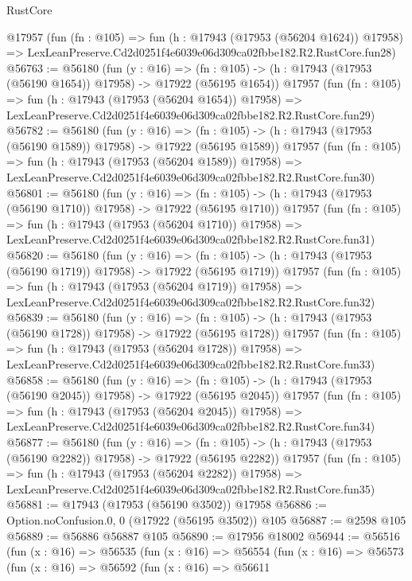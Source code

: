 \begin{lexlean}{RustCore}
\begin{coremodule}
    @17957
    (fun (fn : @105) =>
    fun (h : @17943 (@17953 (@56204 @1624)) @17958) =>
    LexLeanPreserve.Cd2d0251f4e6039e06d309ca02fbbe182.R2.RustCore.fun28)
@56763 := @56180
    (fun (y : @16) =>
    (fn : @105) -> (h : @17943 (@17953 (@56190 @1654)) @17958) -> @17922 (@56195 @1654))
    @17957
    (fun (fn : @105) =>
    fun (h : @17943 (@17953 (@56204 @1654)) @17958) =>
    LexLeanPreserve.Cd2d0251f4e6039e06d309ca02fbbe182.R2.RustCore.fun29)
@56782 := @56180
    (fun (y : @16) =>
    (fn : @105) -> (h : @17943 (@17953 (@56190 @1589)) @17958) -> @17922 (@56195 @1589))
    @17957
    (fun (fn : @105) =>
    fun (h : @17943 (@17953 (@56204 @1589)) @17958) =>
    LexLeanPreserve.Cd2d0251f4e6039e06d309ca02fbbe182.R2.RustCore.fun30)
@56801 := @56180
    (fun (y : @16) =>
    (fn : @105) -> (h : @17943 (@17953 (@56190 @1710)) @17958) -> @17922 (@56195 @1710))
    @17957
    (fun (fn : @105) =>
    fun (h : @17943 (@17953 (@56204 @1710)) @17958) =>
    LexLeanPreserve.Cd2d0251f4e6039e06d309ca02fbbe182.R2.RustCore.fun31)
@56820 := @56180
    (fun (y : @16) =>
    (fn : @105) -> (h : @17943 (@17953 (@56190 @1719)) @17958) -> @17922 (@56195 @1719))
    @17957
    (fun (fn : @105) =>
    fun (h : @17943 (@17953 (@56204 @1719)) @17958) =>
    LexLeanPreserve.Cd2d0251f4e6039e06d309ca02fbbe182.R2.RustCore.fun32)
@56839 := @56180
    (fun (y : @16) =>
    (fn : @105) -> (h : @17943 (@17953 (@56190 @1728)) @17958) -> @17922 (@56195 @1728))
    @17957
    (fun (fn : @105) =>
    fun (h : @17943 (@17953 (@56204 @1728)) @17958) =>
    LexLeanPreserve.Cd2d0251f4e6039e06d309ca02fbbe182.R2.RustCore.fun33)
@56858 := @56180
    (fun (y : @16) =>
    (fn : @105) -> (h : @17943 (@17953 (@56190 @2045)) @17958) -> @17922 (@56195 @2045))
    @17957
    (fun (fn : @105) =>
    fun (h : @17943 (@17953 (@56204 @2045)) @17958) =>
    LexLeanPreserve.Cd2d0251f4e6039e06d309ca02fbbe182.R2.RustCore.fun34)
@56877 := @56180
    (fun (y : @16) =>
    (fn : @105) -> (h : @17943 (@17953 (@56190 @2282)) @17958) -> @17922 (@56195 @2282))
    @17957
    (fun (fn : @105) =>
    fun (h : @17943 (@17953 (@56204 @2282)) @17958) =>
    LexLeanPreserve.Cd2d0251f4e6039e06d309ca02fbbe182.R2.RustCore.fun35)
@56881 := @17943 (@17953 (@56190 @3502)) @17958
@56886 := Option.noConfusion.{0, 0} (@17922 (@56195 @3502)) @105
@56887 := @2598 @105
@56889 := @56886 @56887 @105
@56890 := @17956 @18002
@56944 := @56516
    (fun (x : @16) =>
    @56535
      (fun (x : @16) =>
      @56554
        (fun (x : @16) =>
        @56573
          (fun (x : @16) =>
          @56592
            (fun (x : @16) =>
            @56611

\end{coremodule}
\end{lexlean}
